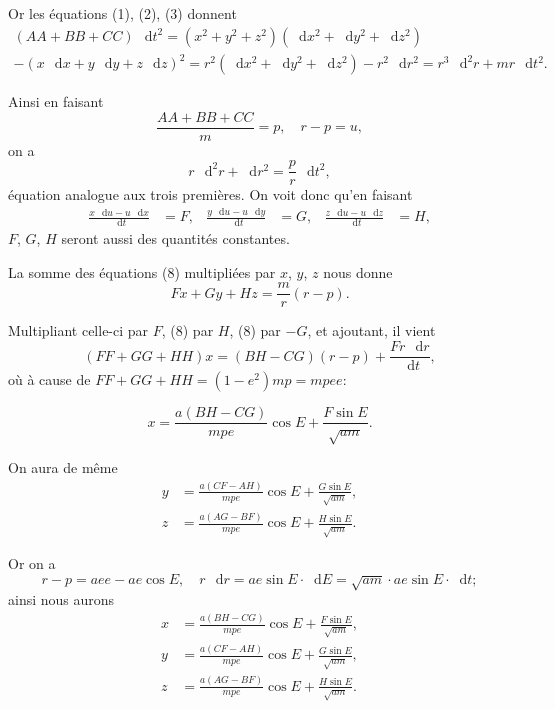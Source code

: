 \documentclass[12pt,a4paper]{article}
\newcommand{\dd}{\mathop{}\!\mathrm{d}}
\begin{document}
Or les \'{e}quations (1), (2), (3) donnent
\begin{multline*}
(AA + BB + CC)\,\dd t^2 = (x^2 + y^2 + z^2)(\dd x^2 + \dd y^2 + \dd z^2) \\
- (x\,\dd x + y\,\dd y + z\,\dd z)^2 = r^2(\dd x^2 + \dd y^2 + \dd z^2) - r^2\,\dd r^2 = r^3\,\dd^2 r + mr\,\dd t^2.
\end{multline*}

Ainsi en faisant
\[
\frac{AA + BB + CC}{m} = p, \quad r - p = u,
\]
on a
\begin{equation}
r\,\dd^2 r + \dd r^2 = \frac{p}{r}\,\dd t^2, \tag{7}
\end{equation}
\'{e}quation analogue aux trois premi\`{e}res. On voit donc qu'en faisant
\begin{align}
\frac{x\,\dd u - u\,\dd x}{\dd t} &= F, &
\frac{y\,\dd u - u\,\dd y}{\dd t} &= G, &
\frac{z\,\dd u - u\,\dd z}{\dd t} &= H, \tag{8}
\end{align}
$F$, $G$, $H$ seront aussi des quantit\'{e}s constantes.

La somme des \'{e}quations (8) multipli\'{e}es par $x$, $y$, $z$ nous donne
\begin{equation}
Fx + Gy + Hz = \frac{m}{r}(r-p). \tag{9}
\end{equation}

Multipliant celle-ci par $F$, (8) par $H$, (8) par $-G$, et ajoutant, il vient
\[
(FF + GG + HH)x = (BH - CG)(r-p) + \frac{Fr\,\dd r}{\dd t},
\]
o\`{u} \`{a} cause de $FF + GG + HH = (1-e^2)mp = mpee$:

\begin{equation}
x = \frac{a(BH-CG)}{mpe} \cos E + \frac{F \sin E}{\sqrt{am}}. \tag{10}
\end{equation}

On aura de m\^{e}me
\begin{align}
y &= \frac{a(CF-AH)}{mpe} \cos E + \frac{G \sin E}{\sqrt{am}}, \tag{11} \\
z &= \frac{a(AG-BF)}{mpe} \cos E + \frac{H \sin E}{\sqrt{am}}. \tag{12}
\end{align}

Or on a
\[
r - p = aee - ae\cos E, \quad r\,\dd r = ae\sin E \cdot \dd E = \sqrt{am} \cdot ae\sin E \cdot \dd t;
\]
ainsi nous aurons
\begin{align}
x &= \frac{a(BH-CG)}{mpe} \cos E + \frac{F \sin E}{\sqrt{am}}, \tag{13} \\
y &= \frac{a(CF-AH)}{mpe} \cos E + \frac{G \sin E}{\sqrt{am}}, \tag{14} \\
z &= \frac{a(AG-BF)}{mpe} \cos E + \frac{H \sin E}{\sqrt{am}}. \tag{15}
\end{align}
\end{document}

